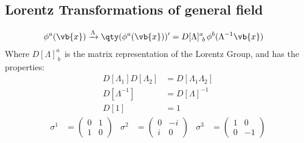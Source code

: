 \subsection{Lorentz Transformations of general field}
\begin{align}
	\phi^{a}(\vb{x})&\xrightarrow{\Lambda}\qty(\phi^{a}(\vb{x}))^{\prime}=D[\Lambda]^{a}_{~b\,}\phi^{b}(\Lambda^{-1}\vb{x})
\end{align}
Where \(D[\Lambda]^{a}_{~b\,}\) is the matrix representation of the Lorentz Group, and has the properties:
\begin{align*}
	D[\Lambda_1]D[\Lambda_2]&=D[\Lambda_1\Lambda_2]
	\\
	D[\Lambda^{-1}]&=D[\Lambda]^{-1}
	\\
	D[1]&=1
\end{align*}
\begin{align*}
	\sigma^1&=\begin{pmatrix} 0 &  1 \\ 1 &  0 \end{pmatrix}&
	\sigma^2&=\begin{pmatrix} 0 & -i \\ i &  0 \end{pmatrix}&
	\sigma^3&=\begin{pmatrix} 1 &  0 \\ 0 & -1 \end{pmatrix}
\end{align*}